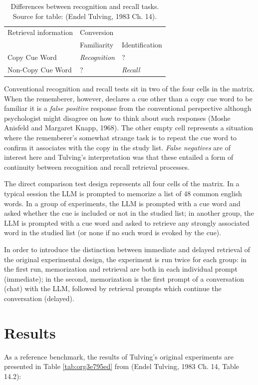 \documentclass[11pt]{article}
\begin{document}
\begin{table}[htbp]
\caption{\label{tab:org3069956}Differences between recognition and recall tasks. Source for table: (Endel Tulving, 1983 Ch. 14).}
\centering
\begin{tabular}{lll}
Retrieval information & Conversion & \\[0pt]
 & Familiarity & Identification\\[0pt]
\hline
Copy Cue Word & \emph{Recognition} & ?\\[0pt]
Non-Copy Cue Word & ? & \emph{Recall}\\[0pt]
\end{tabular}
\end{table}

Conventional recognition and recall tests sit in two of the four cells in the matrix. When the rememberer, however, declares a cue other than a copy cue word to be familiar it is a \emph{false positive} response from the conventional perspective although psychologist might disagree on how to think about such responses (Moshe Anisfeld and Margaret Knapp, 1968). The other empty cell represents a situation where the rememberer's somewhat strange task is to repeat the cue word to confirm it associates with the copy in the study list. \emph{False negatives} are of interest here and Tulving's interpretation was that these entailed a form of continuity between recognition and recall retrieval processes.

The direct comparison test design represents all four cells of the matrix. In a typical session the LLM is prompted to memorize a list of 48 common english words. In a group of experiments, the LLM is prompted with a cue word and asked whether the cue is included or not in the studied list; in another group, the LLM is prompted with a cue word and asked to retrieve any strongly associated word in the studied list (or none if no such word is evoked by the cue).

In order to introduce the distinction between immediate and delayed retrieval of the original experimental design, the experiment is run twice for each group: in the first run, memorization and retrieval are both in each individual prompt (immediate); in the second, memorization is the first prompt of a conversation (chat) with the LLM, followed by retrieval prompts which continue the conversation (delayed).

\section*{Results}
\label{sec:org72ac89b}
As a reference benchmark, the results of Tulving's original experiments are presented in Table \ref{tab:org3e795ed} from (Endel Tulving, 1983 Ch. 14, Table 14.2):
\end{document}
